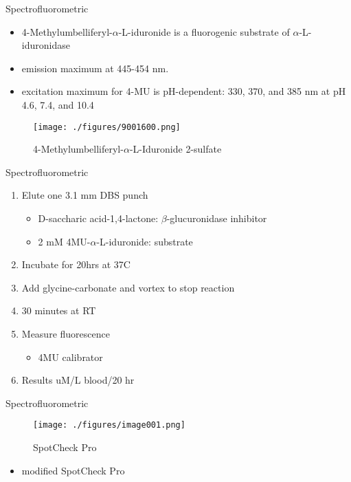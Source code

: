 \documentclass[presentation, smaller]{beamer}
\begin{document}
\begin{frame}[label={sec:orgc2a1f70}]{Spectrofluorometric}
\begin{itemize}
\item 4-Methylumbelliferyl-\(\alpha\)-L-iduronide is a fluorogenic substrate of \(\alpha\)-L-iduronidase
\item emission maximum at 445-454 nm.
\item excitation maximum for 4-MU is pH-dependent: 330, 370, and 385 nm at pH 4.6, 7.4, and 10.4
\end{itemize}

\begin{figure}[htbp]
\centering
\texttt{[image: ./figures/9001600.png]}
\caption[4MUI]{\label{fig:org00bcda6}
4-Methylumbelliferyl-\(\alpha\)-L-Iduronide 2-sulfate}
\end{figure}
\end{frame}


\begin{frame}[label={sec:orgd6e3b05}]{Spectrofluorometric}
\begin{enumerate}
\item Elute one 3.1 mm DBS punch
\begin{itemize}
\item D-saccharic acid-1,4-lactone: \(\beta\)-glucuronidase inhibitor
\item 2 mM 4MU-\(\alpha\)-L-iduronide: substrate
\end{itemize}
\item Incubate for 20hrs at 37\degree C
\item Add glycine-carbonate and vortex to stop reaction
\item 30 minutes at RT
\item Measure fluorescence
\begin{itemize}
\item 4MU calibrator
\end{itemize}
\item Results uM/L blood/20 hr
\end{enumerate}
\end{frame}


\begin{frame}[label={sec:orge9e0219}]{Spectrofluorometric}
\begin{figure}[htbp]
\centering
\texttt{[image: ./figures/image001.png]}
\caption{\label{fig:org84a86da}
SpotCheck Pro}
\end{figure}

\begin{itemize}
\item modified SpotCheck Pro
\end{itemize}
\end{frame}
\end{document}
